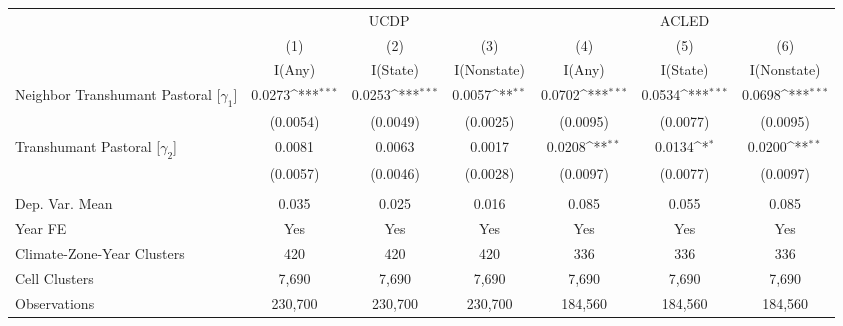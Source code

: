 {
\def\sym#1{\ifmmode^{#1}\else\(^{#1}\)\fi}
\begin{tabular}{l*{6}{c}}
\toprule
                    &\multicolumn{3}{c}{UCDP}                                         &\multicolumn{3}{c}{ACLED}                                        \\\cmidrule(lr){2-4}\cmidrule(lr){5-7}
                    &\multicolumn{1}{c}{(1)}&\multicolumn{1}{c}{(2)}&\multicolumn{1}{c}{(3)}&\multicolumn{1}{c}{(4)}&\multicolumn{1}{c}{(5)}&\multicolumn{1}{c}{(6)}\\
                    &\multicolumn{1}{c}{I(Any)}&\multicolumn{1}{c}{I(State)}&\multicolumn{1}{c}{I(Nonstate)}&\multicolumn{1}{c}{I(Any)}&\multicolumn{1}{c}{I(State)}&\multicolumn{1}{c}{I(Nonstate)}\\
\midrule
Neighbor Transhumant Pastoral [$\gamma_{1}$]&      0.0273\sym{***}&      0.0253\sym{***}&      0.0057\sym{**} &      0.0702\sym{***}&      0.0534\sym{***}&      0.0698\sym{***}\\
                    &    (0.0054)         &    (0.0049)         &    (0.0025)         &    (0.0095)         &    (0.0077)         &    (0.0095)         \\
\addlinespace
Transhumant Pastoral [$\gamma_{2}$]&      0.0081         &      0.0063         &      0.0017         &      0.0208\sym{**} &      0.0134\sym{*}  &      0.0200\sym{**} \\
                    &    (0.0057)         &    (0.0046)         &    (0.0028)         &    (0.0097)         &    (0.0077)         &    (0.0097)         \\
\midrule
\\ Dep. Var. Mean   &       0.035         &       0.025         &       0.016         &       0.085         &       0.055         &       0.085         \\
Year FE             &         Yes         &         Yes         &         Yes         &         Yes         &         Yes         &         Yes         \\
Climate-Zone-Year Clusters&         420         &         420         &         420         &         336         &         336         &         336         \\
Cell Clusters       &       7,690         &       7,690         &       7,690         &       7,690         &       7,690         &       7,690         \\
Observations        &     230,700         &     230,700         &     230,700         &     184,560         &     184,560         &     184,560         \\
\bottomrule
\end{tabular}
}
